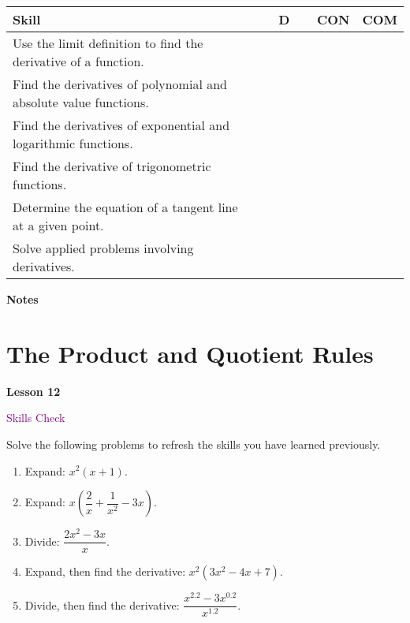\documentclass[10pt]{book}
\theoremstyle{definition}
\theoremstyle{remark}
\begin{document}
\begin{large}
\begin{center}
\begin{tabular}{|l|l|l|l|}
\hline
\textbf{Skill} & \textbf{~~D~~} & \textbf{CON} & \textbf{COM} \\
\hline
Use the limit definition to find the derivative of a function.&&&\\
\hline
Find the derivatives of polynomial and absolute value functions.&&&\\
\hline
Find the derivatives of exponential and logarithmic functions.&&&\\
\hline
Find the derivative of trigonometric functions.&&&\\
\hline
Determine the equation of a tangent line at a given point.&&&\\
\hline
Solve applied problems involving derivatives.&&&\\
\hline
\end{tabular}
\end{center}
 \vfil

\noindent
\textbf{Notes}
\end{large} \vfil
\newpage


\section{The Product and Quotient Rules}
\begin{tcolorbox}[
  width=\textwidth,
  colback=gray!10, %
  colframe=white, %
  boxrule=0pt,    %
  left=1cm,       %
  right=1cm,      %
  sharp corners  %
]

\begin{minipage}[t]{0.5\textwidth}
  \Huge \textbf{Lesson 12}
\end{minipage}%
\hfill
\begin{minipage}[t]{0.5\textwidth}
  \Huge \textcolor{purple}{Skills Check}
\end{minipage}
\end{tcolorbox}

\begin{large}
\noindent
Solve the following problems to refresh the skills you have learned previously.
\begin{enumerate}
\item Expand: $x^{2}(x+1)$.\vfil \vfil \vfil
\item Expand: $x \left( \dfrac{2}{x}  + \dfrac{1}{x^{2}} - 3x\right)$.\vfil \vfil \vfil
\item Divide: $\dfrac{2x^{2} - 3x}{x}$.\vfil \vfil\vfil
\item Expand, then find the derivative: $x^{2}(3x^{2} - 4x + 7)$.\vfil \vfil \vfil
\item Divide, then find the derivative: $\dfrac{x^{2.2} - 3x^{0.2}}{x^{1.2}}$.\vfil \vfil \vfil
\end{enumerate}
\end{large}
\newpage
\end{document}
